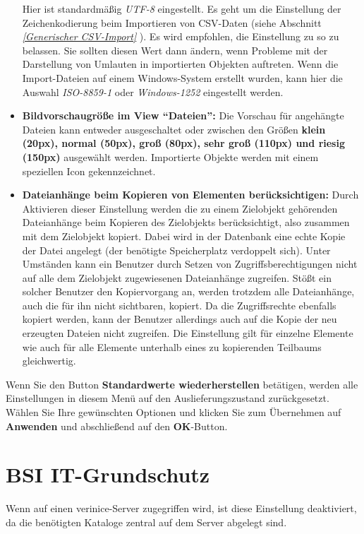 \documentclass[a4paper,10pt]{book}
\begin{document}
\begin{itemize}
  Hier ist standardmäßig {\em UTF-8} eingestellt. Es geht um die
  Einstellung der Zeichenkodierung beim Importieren von CSV-Daten
  (siehe Abschnitt {\em \ref{Generischer CSV-Import}
    }). Es wird empfohlen, die
  Einstellung zu so zu belassen. Sie sollten diesen Wert dann ändern,
  wenn Probleme mit der Darstellung von Umlauten in importierten
  Objekten auftreten. Wenn die Import-Dateien auf einem Windows-System
  erstellt wurden, kann hier die Auswahl {\em ISO-8859-1} oder {\em
    Windows-1252} eingestellt werden.
\item \textbf{Bildvorschaugröße im View ``Dateien'':} Die Vorschau für
  angehängte Dateien kann entweder ausgeschaltet oder zwischen den
  Größen \textbf{klein (20px), normal (50px), groß (80px), sehr groß
    (110px) und riesig (150px)} ausgewählt werden. Importierte Objekte
  werden mit einem speziellen Icon gekennzeichnet.
\item \textbf{Dateianhänge beim Kopieren von Elementen
berücksichtigen:}
\newline Durch Aktivieren dieser Einstellung werden die zu einem
Zielobjekt gehörenden Dateianhänge beim Kopieren des Zielobjekts
berücksichtigt, also zusammen mit dem Zielobjekt kopiert.
Dabei wird in der Datenbank eine echte Kopie der Datei angelegt (der benötigte
Speicherplatz verdoppelt sich). Unter Umständen kann ein Benutzer durch
Setzen von Zugriffsberechtigungen nicht auf alle dem Zielobjekt
zugewiesenen Dateianhänge zugreifen. Stößt ein solcher Benutzer den
Kopiervorgang an, werden trotzdem alle Dateianhänge, auch die für ihn nicht sichtbaren,
kopiert. Da die Zugriffsrechte ebenfalls kopiert werden, kann der Benutzer
allerdings auch auf die Kopie der neu erzeugten Dateien nicht zugreifen.
Die Einstellung gilt für einzelne Elemente wie auch für alle Elemente unterhalb
eines zu kopierenden Teilbaums gleichwertig.
\end{itemize}

Wenn Sie den Button \textbf{Standardwerte wiederherstellen} betätigen,
werden alle Einstellungen in diesem Menü auf den Auslieferungszustand
zurückgesetzt.
\newline\\
Wählen Sie Ihre gewünschten Optionen und klicken Sie zum Übernehmen
auf \textbf{Anwenden} und abschließend auf den \textbf{OK}-Button.

\section{BSI IT-Grundschutz}
Wenn auf einen verinice-Server zugegriffen wird, ist diese Einstellung
deaktiviert, da die benötigten Kataloge zentral auf dem Server abgelegt sind.
\end{document}
